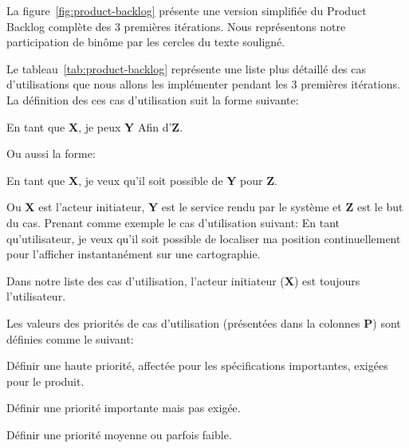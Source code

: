 La figure~\ref{fig:product-backlog} présente une version simplifiée du Product
Backlog complète des 3 premières itérations. Nous représentons notre
participation de binôme par les cercles du texte souligné.



Le tableau~\ref{tab:product-backlog} représente une liste plus détaillé des cas
d'utilisations que nous allons les implémenter pendant les 3 premières
itérations.  La définition des ces cas d'utilisation suit la forme suivante:

\begin{displayquote}
    En tant que \textbf{X}, je peux \textbf{Y} Afin d'\textbf{Z}.
\end{displayquote}

Ou aussi la forme:

\begin{displayquote}
    En tant que \textbf{X}, je veux qu'il soit possible de \textbf{Y} pour
    \textbf{Z}.
\end{displayquote}

Ou \textbf{X} est l'acteur initiateur, \textbf{Y} est le service rendu par le
système et \textbf{Z} est le but du cas. Prenant comme exemple le cas
d'utilisation suivant: En tant qu'utilisateur, je veux qu'il soit possible de
localiser ma position continuellement pour l'afficher instantanément sur une
cartographie.

Dans notre liste des cas d'utilisation, l'acteur initiateur (\textbf{X}) est
toujours l'utilisateur.

Les valeurs des priorités de cas d'utilisation (présentées dans la colonnes
\textbf{P}) sont définies comme le suivant:

\begin{description}[align=right,labelwidth=1cm]
    \item [1:] Définir une haute priorité, affectée pour les spécifications
        importantes, exigées pour le produit.
    \item [2:] Définir une priorité importante mais pas exigée.
    \item [3:] Définir une priorité moyenne ou parfois faible.
\end{description}

